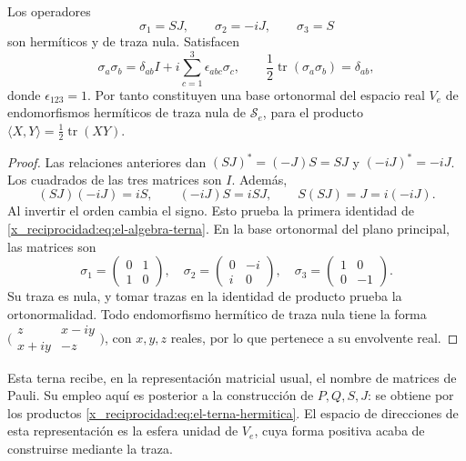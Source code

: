 \begin{proposition}
\label{x_reciprocidad:prop:el-terna-hermitica}
Los operadores
\begin{equation}
 \sigma_1=SJ,\qquad \sigma_2=-iJ,\qquad \sigma_3=S
 \label{x_reciprocidad:eq:el-terna-hermitica}
\end{equation}
son hermíticos y de traza nula. Satisfacen
\begin{equation}
 \sigma_a\sigma_b
 =\delta_{ab}I+i\sum_{c=1}^3\epsilon_{abc}\sigma_c,
 \qquad
 \frac12\operatorname{tr}(\sigma_a\sigma_b)=\delta_{ab},
 \label{x_reciprocidad:eq:el-algebra-terna}
\end{equation}
donde \(\epsilon_{123}=1\). Por tanto constituyen una base ortonormal
del espacio real \(V_e\) de endomorfismos hermíticos de traza nula de
\(\mathscr S_e\), para el producto
\(\langle X,Y\rangle=\frac12\operatorname{tr}(XY)\).
\end{proposition}
\begin{proof}
Las relaciones anteriores dan \((SJ)^*=(-J)S=SJ\) y
\((-iJ)^*=-iJ\). Los cuadrados de las tres matrices son \(I\).
Además,
\[
 (SJ)(-iJ)=iS,\qquad (-iJ)S=iSJ,\qquad S(SJ)=J=i(-iJ).
\]
Al invertir el orden cambia el signo. Esto prueba la primera identidad
de \eqref{x_reciprocidad:eq:el-algebra-terna}. En la base ortonormal del plano principal,
las matrices son
\[
 \sigma_1=\begin{pmatrix}0&1\\1&0\end{pmatrix},\quad
 \sigma_2=\begin{pmatrix}0&-i\\i&0\end{pmatrix},\quad
 \sigma_3=\begin{pmatrix}1&0\\0&-1\end{pmatrix}.
\]
Su traza es nula, y tomar trazas en la identidad de producto prueba la
ortonormalidad. Todo endomorfismo hermítico de traza nula tiene la forma
\(\bigl(\begin{smallmatrix}z&x-iy\\x+iy&-z\end{smallmatrix}\bigr)\),
con \(x,y,z\) reales, por lo que pertenece a su envolvente real.
\end{proof}

Esta terna recibe, en la representación matricial usual, el nombre de
matrices de Pauli. Su empleo aquí es posterior a la construcción de
\(P,Q,S,J\): se obtiene por los productos
\eqref{x_reciprocidad:eq:el-terna-hermitica}. El espacio de direcciones de esta
representación es la esfera unidad de \(V_e\), cuya forma positiva
acaba de construirse mediante la traza.

